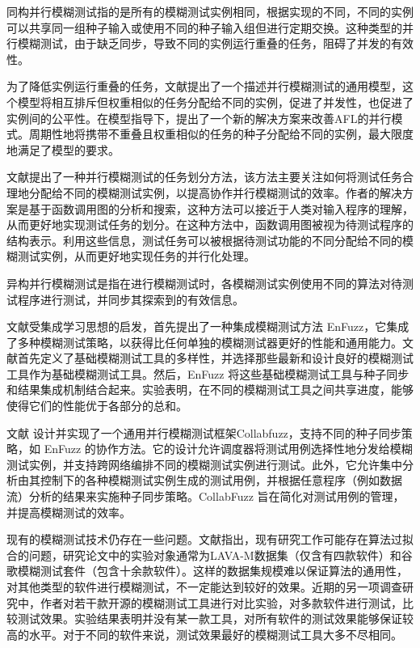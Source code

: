 \documentclass[master]{thesis-uestc}
\begin{document}
同构并行模糊测试指的是所有的模糊测试实例相同，根据实现的不同，不同的实例可以共享同一组种子输入或使用不同的种子输入组但进行定期交换。这种类型的并行模糊测试，由于缺乏同步，导致不同的实例运行重叠的任务，阻碍了并发的有效性。

为了降低实例运行重叠的任务，文献\cite{wang2021facilitating}提出了一个描述并行模糊测试的通用模型，这个模型将相互排斥但权重相似的任务分配给不同的实例，促进了并发性，也促进了实例间的公平性。在模型指导下，提出了一个新的解决方案来改善AFL的并行模式。周期性地将携带不重叠且权重相似的任务的种子分配给不同的实例，最大限度地满足了模型的要求。

文献\cite{pham2021towards}提出了一种并行模糊测试的任务划分方法，该方法主要关注如何将测试任务合理地分配给不同的模糊测试实例，以提高协作并行模糊测试的效率。作者的解决方案是基于函数调用图的分析和搜索，这种方法可以接近于人类对输入程序的理解，从而更好地实现测试任务的划分。在这种方法中，函数调用图被视为待测试程序的结构表示。利用这些信息，测试任务可以被根据待测试功能的不同分配给不同的模糊测试实例，从而更好地实现任务的并行化处理。

异构并行模糊测试是指在进行模糊测试时，各模糊测试实例使用不同的算法对待测试程序进行测试，并同步其探索到的有效信息。

文献\cite{chen2019enfuzz}受集成学习思想的启发，首先提出了一种集成模糊测试方法 EnFuzz，它集成了多种模糊测试策略，以获得比任何单独的模糊测试器更好的性能和通用能力。文献首先定义了基础模糊测试工具的多样性，并选择那些最新和设计良好的模糊测试工具作为基础模糊测试工具。然后，EnFuzz 将这些基础模糊测试工具与种子同步和结果集成机制结合起来。实验表明，在不同的模糊测试工具之间共享进度，能够使得它们的性能优于各部分的总和。

文献\cite{osterlund2021collabfuzz} 设计并实现了一个通用并行模糊测试框架Collabfuzz，支持不同的种子同步策略，如 EnFuzz 的协作方法。它的设计允许调度器将测试用例选择性地分发给模糊测试实例，并支持跨网络编排不同的模糊测试实例进行测试。此外，它允许集中分析由其控制下的各种模糊测试实例生成的测试用例，并根据任意程序（例如数据流）分析的结果来实施种子同步策略。CollabFuzz 旨在简化对测试用例的管理，并提高模糊测试的效率。

现有的模糊测试技术仍存在一些问题。文献\cite{bohme2021fuzzing}指出，现有研究工作可能存在算法过拟合的问题，研究论文中的实验对象通常为LAVA-M数据集（仅含有四款软件）和谷歌模糊测试套件（包含十余款软件）。这样的数据集规模难以保证算法的通用性，对其他类型的软件进行模糊测试，不一定能达到较好的效果。近期的另一项调查研究中，作者对若干款开源的模糊测试工具进行对比实验，对多款软件进行测试，比较测试效果。实验结果表明并没有某一款工具，对所有软件的测试效果能够保证较高的水平。对于不同的软件来说，测试效果最好的模糊测试工具大多不尽相同。
\end{document}

